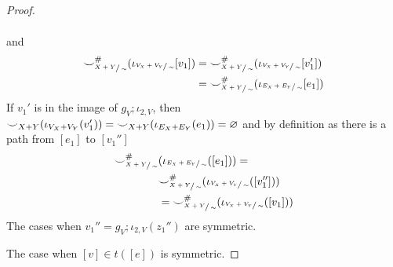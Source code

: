 \begin{proof}
\begin{itemize}
\begin{itemize}
\begin{itemize}
\begin{align*}
                              \end{align*}
                              and
                              \begin{align*}
                                {\smile}_{\sfrac{X+Y}{\sim}}^{{\#}}(\iota_{\sfrac{V_{X} + V_{Y}}{\sim}}[v_1]) &=
                                {\smile}_{\sfrac{X+Y}{\sim}}^{{\#}}(\iota_{\sfrac{V_{X} + V_{Y}}{\sim}}[v_1'])\\ &= {\smile}_{\sfrac{X+Y}{\sim}}^{{\#}}(\iota_{\sfrac{E_{X} + E_{Y}}{\sim}}[e_1])
                              \end{align*}
                              If $v_1'$ is in the image of $g_{V};\iota_{2,V}$, then ${\smile}_{X+Y}(\iota_{V_{X} + V_{Y}}(v_1')) = {\smile}_{X+Y}(\iota_{E_{X} + E_{Y}}(e_1)) = \varnothing$ and by definition as there is a path from $[e_1]$ to $[v_1'']$
                              \begin{align*}
                                {\smile}_{\sfrac{X+Y}{\sim}}^{{\#}}&(\iota_{\sfrac{E_{X} + E_{Y}}{\sim}}([e_1])) =\\
                                &{\smile}_{\sfrac{X+Y}{\sim}}^{{\#}}(\iota_{\sfrac{V_{X} + V_{Y}}{\sim}}([v_1'']))\\ 
                                                                                                                        &= {\smile}_{\sfrac{X+Y}{\sim}}^{{\#}}(\iota_{\sfrac{V_{X} + V_{Y}}{\sim}}([v_1]))
                              \end{align*}
                              The cases when $v_1'' = g_{V};\iota_{2,V}(z_1'')$ are symmetric.
                    \end{itemize}
                \end{itemize}
     \end{itemize}
The case when $[v] \in t([e])$ is symmetric.
\end{proof}


